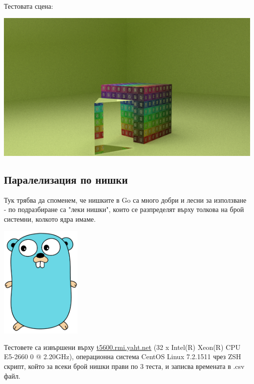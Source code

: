 \documentclass[12pt]{extarticle}
\begin{document}
\pagebreak
Тестовата сцена:
\begin{center}
\includegraphics[width=\textwidth]{cube.png}
\end{center}


\subsection{Паралелизация по нишки}
Тук трябва да споменем, че нишките в Go са много добри и лесни
за използване - по подразбиране са "леки нишки", които се разпределят
върху толкова на брой системни, колкото ядра имаме.

\begin{center}
\includegraphics[width=0.3\textwidth]{gopher.pdf}
\end{center}
Тестовете са извършени върху \url{t5600.rmi.yaht.net}
(32 x Intel(R) Xeon(R) CPU E5-2660 0 @ 2.20GHz),
операционна система CentOS Linux 7.2.1511 чрез ZSH скрипт,
който за всеки брой нишки прави по 3 теста, и записва времената
в .csv файл.
\end{document}
